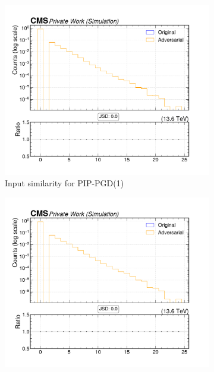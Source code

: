 \begin{figure}[htbp]
  \centering
  \begin{subfigure}[t]{0.32\textwidth}
    \includegraphics[width=\linewidth]{media/output/features/compare/combined_it_1/cmp_vtx_arr_sv_ntracks.pdf}
    \caption*{Input similarity for PIP-PGD(1)}
  \end{subfigure}\hfill
  \begin{subfigure}[t]{0.32\textwidth}
    \includegraphics[width=\linewidth]{media/output/features/compare/combined_it_2/cmp_vtx_arr_sv_ntracks.pdf}

\end{subfigure}
\end{figure}
